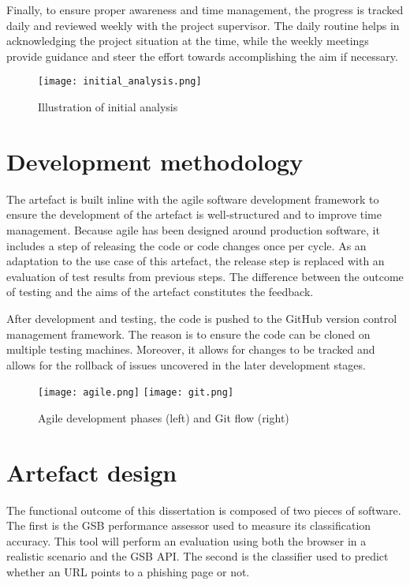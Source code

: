 Finally, to ensure proper awareness and time management, the progress is tracked daily and reviewed weekly with the project supervisor. The daily routine helps in acknowledging the project situation at the time, while the weekly meetings provide guidance and steer the effort towards accomplishing the aim if necessary.

\begin{figure}
	\centering
	\texttt{[image: initial\_analysis.png]}
	\caption{Illustration of initial analysis}
	\label{fig:INITIAL_ANALYSIS}
\end{figure}

\section{Development methodology}
The artefact is built inline with the agile software development framework to ensure the development of the artefact is well-structured and to improve time management. Because agile has been designed around production software, it includes a step of releasing the code or code changes once per cycle. As an adaptation to the use case of this artefact, the release step is replaced with an evaluation of test results from previous steps. The difference between the outcome of testing and the aims of the artefact constitutes the feedback.

After development and testing, the code is pushed to the GitHub version control management framework. The reason is to ensure the code can be cloned on multiple testing machines. Moreover, it allows for changes to be tracked and allows for the rollback of issues uncovered in the later development stages.

\begin{figure}[b]
	\centering
	\texttt{[image: agile.png]}
	\texttt{[image: git.png]}
	\caption{Agile development phases (left) and Git flow (right)}
	\label{fig:INITIAL_ANALYSIS}
\end{figure}

\section{Artefact design}
The functional outcome of this dissertation is composed of two pieces of software. The first is the GSB performance assessor used to measure its classification accuracy. This tool will perform an evaluation using both the browser in a realistic scenario and the GSB API. The second is the classifier used to predict whether an URL points to a phishing page or not.

